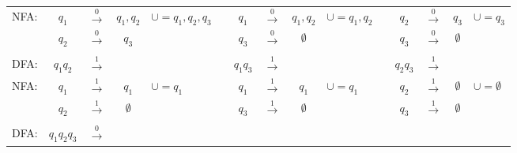 \documentclass[
	final,
	a4paper,
	oneside,
	parskip=full,
	headings=standardclasses,
	headings=big,
	pointednumbers
]{scrartcl}
\begin{document}
\begin{tabular}{l|ccc|ll|ccc|ll|ccc|l}
            \cline{2-4} \cline{7-9} \cline{12-14}
            \multirow{2}{*}{NFA:}    & $q_1$    & $\xrightarrow{0}$ & $q_1,q_2$   & \multirow{2}{*}{$\cup = q_1,q_2,q_3$} &
            \multirow{2}{*}{}        & $q_1$    & $\xrightarrow{0}$ & $q_1,q_2$   & \multirow{2}{*}{$\cup = q_1,q_2$} &
            \multirow{2}{*}{}        & $q_2$    & $\xrightarrow{0}$ & $q_3$       & \multirow{2}{*}{$\cup = q_3$}
        \\
                                     & $q_2$    & $\xrightarrow{0}$ & $q_3$       & &
                                     & $q_3$    & $\xrightarrow{0}$ & $\emptyset$ & &
                                     & $q_3$    & $\xrightarrow{0}$ & $\emptyset$ &
        \\
            \cline{2-4} \cline{7-9} \cline{12-14}
            \multicolumn{1}{c}{} & & & \multicolumn{1}{c}{} & &
            \multicolumn{1}{c}{} & & & \multicolumn{1}{c}{} & &
            \multicolumn{1}{c}{} & & & \multicolumn{1}{c}{} &
        \\
            \multicolumn{1}{c}{DFA:} & $q_1q_2$ & $\xrightarrow{1}$ & \multicolumn{1}{c}{} & & 
            \multicolumn{1}{c}{}     & $q_1q_3$ & $\xrightarrow{1}$ & \multicolumn{1}{c}{} & & 
            \multicolumn{1}{c}{}     & $q_2q_3$ & $\xrightarrow{1}$ & \multicolumn{1}{c}{} &
        \\  
            \cline{2-4} \cline{7-9} \cline{12-14}
            \multirow{2}{*}{NFA:}    & $q_1$    & $\xrightarrow{1}$ & $q_1$       & \multirow{2}{*}{$\cup = q_1$} &
            \multirow{2}{*}{}        & $q_1$    & $\xrightarrow{1}$ & $q_1$       & \multirow{2}{*}{$\cup = q_1$} &
            \multirow{2}{*}{}        & $q_2$    & $\xrightarrow{1}$ & $\emptyset$ & \multirow{2}{*}{$\cup = \emptyset$}
        \\
                                     & $q_2$    & $\xrightarrow{1}$ & $\emptyset$ & &
                                     & $q_3$    & $\xrightarrow{1}$ & $\emptyset$ & &
                                     & $q_3$    & $\xrightarrow{1}$ & $\emptyset$ &
        \\
            \cline{2-4} \cline{7-9} \cline{12-14}
            \multicolumn{1}{c}{} & & & \multicolumn{1}{c}{} & &
            \multicolumn{1}{c}{} & & & \multicolumn{1}{c}{} & &
            \multicolumn{1}{c}{} & & & \multicolumn{1}{c}{} &
        \\
            \multicolumn{1}{c}{DFA:} & $q_1q_2q_3$ & $\xrightarrow{0}$ & \multicolumn{1}{c}{} & & 

\end{tabular}
\end{document}
